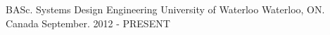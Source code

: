 

\begin{cventries}

  \cventry
    {BASc. Systems Design Engineering} %
    {University of Waterloo} %
    {Waterloo, ON. Canada} %
    {September. 2012 - PRESENT} %
    {
      \begin{cvitems} %
      \end{cvitems}
    }

\end{cventries}
